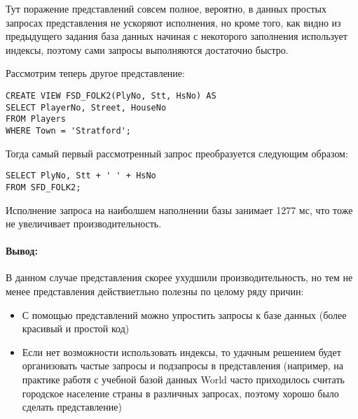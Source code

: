 \documentclass[a4paper,12pt]{article}
\begin{document}
Тут поражение представлений совсем полное, вероятно, в данных простых запросах представления не ускоряют исполнения, но кроме того, как видно из предыдущего задания база данных начиная с некоторого заполнения использует индексы, поэтому сами запросы выполняются достаточно быстро.

Рассмотрим теперь другое представление:

\begin{lstlisting}
CREATE VIEW FSD_FOLK2(PlyNo, Stt, HsNo) AS
SELECT PlayerNo, Street, HouseNo
FROM Players
WHERE Town = 'Stratford';
\end{lstlisting}

Тогда самый первый рассмотренный запрос преобразуется следующим образом:

\begin{lstlisting}
SELECT PlyNo, Stt + ' ' + HsNo
FROM SFD_FOLK2;
\end{lstlisting}

Исполнение запроса на наиболшем наполнении базы занимает 1277 мс, что тоже не увеличивает производительность.

\paragraph{Вывод:} В данном случае представления скорее ухудшили производительность, но тем не менее представления действиетльно полезны по целому ряду причин:

\begin{itemize}
\item С помощью представлений можно упростить запросы к базе данных (более красивый и простой код)

\item Если нет возможности использовать индексы, то удачным решением будет организовать частые запросы и подзапросы в представления (например, на практике работя с учебной базой данных World часто приходилось считать городское население страны в различных запросах, поэтому хорошо было сделать представление)
\end{itemize}
\end{document}

